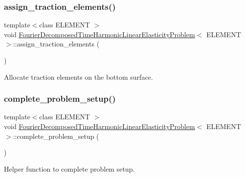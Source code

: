 \subsubsection{\texorpdfstring{assign\+\_\+traction\+\_\+elements()}{assign\_traction\_elements()}\hspace{0.1cm}{\footnotesize\ttfamily [3/3]}}
{\footnotesize\ttfamily template$<$class E\+L\+E\+M\+E\+NT $>$ \\
void \hyperlink{classFourierDecomposedTimeHarmonicLinearElasticityProblem}{Fourier\+Decomposed\+Time\+Harmonic\+Linear\+Elasticity\+Problem}$<$ E\+L\+E\+M\+E\+NT $>$\+::assign\+\_\+traction\+\_\+elements (\begin{DoxyParamCaption}{ }\end{DoxyParamCaption})\hspace{0.3cm}{\ttfamily [private]}}



Allocate traction elements on the bottom surface. 

\mbox{\label{classFourierDecomposedTimeHarmonicLinearElasticityProblem_aeb3e1638026cb1cabf1b16a32496f63c}} 
\subsubsection{\texorpdfstring{complete\+\_\+problem\+\_\+setup()}{complete\_problem\_setup()}\hspace{0.1cm}{\footnotesize\ttfamily [1/2]}}
{\footnotesize\ttfamily template$<$class E\+L\+E\+M\+E\+NT $>$ \\
void \hyperlink{classFourierDecomposedTimeHarmonicLinearElasticityProblem}{Fourier\+Decomposed\+Time\+Harmonic\+Linear\+Elasticity\+Problem}$<$ E\+L\+E\+M\+E\+NT $>$\+::complete\+\_\+problem\+\_\+setup (\begin{DoxyParamCaption}{ }\end{DoxyParamCaption})}



Helper function to complete problem setup. 

